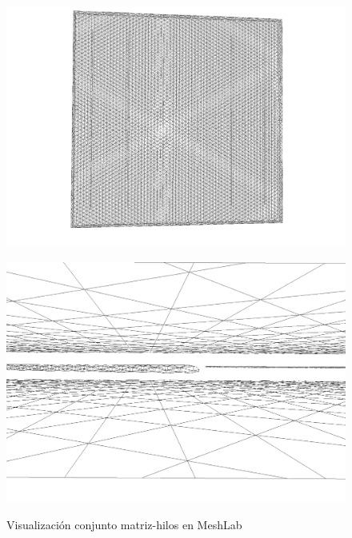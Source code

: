 \documentclass[12pt,letterpaper]{article}
\numberwithin{equation}{section}
\begin{document}
\begin{figure}[H]
	\begin{minipage}{0.5\linewidth}
		\hspace{-15mm}
		\centering\includegraphics[scale=0.26]{Imagenes/muestra_meshlab.png}\\
	\end{minipage}
	\begin{minipage}{0.5\linewidth}
		\centering\includegraphics[scale=0.25]{Imagenes/muestra_meshlab01.png}\\
	\end{minipage}
	\caption{Visualización conjunto matriz-hilos en MeshLab}
	\label{fig:Muestrameshlab}
\end{figure}

\end{document}
